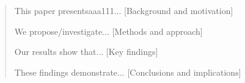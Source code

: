 \begin{abstract}

This paper presentsaaa111... [Background and motivation]

We propose/investigate... [Methods and approach]

Our results show that... [Key findings]

These findings demonstrate... [Conclusions and implications]

\end{abstract}